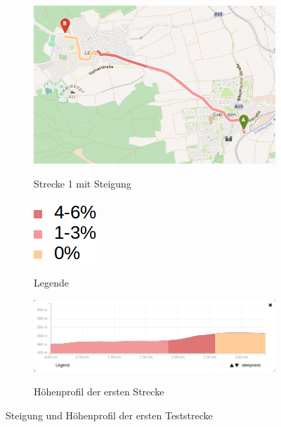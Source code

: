 \documentclass[12pt,a4paper]{article}
\begin{document}
\begin{figure}[h]
\centering
\begin{subfigure}{0.80\textwidth}
\centering
\includegraphics[width = \textwidth]{../media/Fahrt1_Steep.png} \\
\caption{Strecke 1 mit Steigung}
\label{fig:steig}
\end{subfigure}
\begin{subfigure}{0.18\textwidth}
\centering
\includegraphics[width =0.60 \textwidth]{../media/legend2.png} \\
\caption{Legende}
\label{fig:legend2}
\end{subfigure}
\begin{subfigure}{ \textwidth}
\centering
\includegraphics[width = \textwidth]{../media/Fahrt1_Profile.png} \\
\vspace{0.1cm}
\caption{Höhenprofil der ersten Strecke}
\label{profile}
\end{subfigure}
\caption{Steigung und Höhenprofil der ersten Teststrecke}
\label{steig}
\end{figure}
\end{document}
